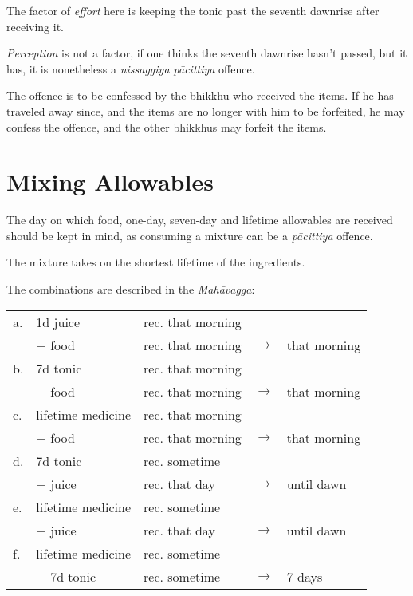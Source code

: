 The factor of \emph{effort} here is keeping the tonic past the seventh dawnrise
after receiving it.

\emph{Perception} is not a factor, if one thinks the seventh dawnrise hasn't
passed, but it has, it is nonetheless a \emph{nissaggiya pācittiya} offence.

The offence is to be confessed by the bhikkhu who received the items. If he has
traveled away since, and the items are no longer with him to be forfeited, he
may confess the offence, and the other bhikkhus may forfeit the items.

\clearpage

\section*{Mixing Allowables}

The day on which food, one-day, seven-day and lifetime allowables are received
should be kept in mind, as consuming a mixture can be a \emph{pācittiya}
offence.

The mixture takes on the shortest lifetime of the ingredients. 

The combinations are described in the \emph{Mahāvagga}:

\begin{tabular}{@{}lllll@{}}
  a. & 1d juice & rec. that morning & & \\
     &  + food     & rec. that morning & \(\rightarrow\) & that morning\\
  \hline
  b. & 7d tonic & rec. that morning & & \\
     & + food   & rec. that morning & \(\rightarrow\) & that morning\\
  \hline
  c. & lifetime medicine & rec. that morning & & \\
     & + food            & rec. that morning & \(\rightarrow\) & that morning\\
  \hline
  d. & 7d tonic & rec. sometime & & \\
     & + juice  & rec. that day & \(\rightarrow\) & until dawn\\
  \hline
  e. & lifetime medicine & rec. sometime & & \\
     & + juice           & rec. that day & \(\rightarrow\) & until dawn\\
  \hline
  f. & lifetime medicine & rec. sometime & & \\
     & + 7d tonic        & rec. sometime & \(\rightarrow\) & 7 days\\
\end{tabular}

